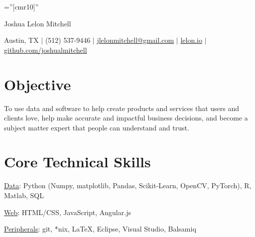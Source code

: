 \documentclass[a4paper,10pt]{article}
\begin{document}

\pagestyle{empty} %

\font\fb=''[cmr10]'' %

\par{\centering
		{\Huge Joshua Lelon Mitchell
	}\par}
\par{\centering
		{
	Austin, TX
	$\mid$
	(512) 537-9446
	$\mid$
	\href {mailto:jlelonmitchell@gmail.com}{jlelonmitchell@gmail.com}
	$\mid$
	\href {http://lelon.io/blog/2018/01/04/to-potential-employers}{lelon.io}
	$\mid$
	\href {https://github.com/joshualmitchell}{github.com/joshualmitchell}
}\par}

\section{Objective}
To use data and software to help create products and services that users and clients love, help make accurate and impactful business decisions, and become a subject matter expert that people can understand and trust.
\section{Core Technical Skills}

\underline{Data}: Python (Numpy, matplotlib, Pandas, Scikit-Learn, OpenCV, PyTorch), R, Matlab, SQL

\underline{Web}: HTML/CSS, JavaScript, Angular.js

\underline{Peripherals}: git, *nix, LaTeX, Eclipse, Visual Studio, Balsamiq

\end{document}
